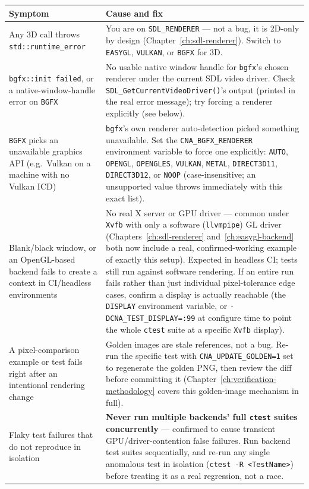 \begin{center}
\begin{longtable}{>{\raggedright\arraybackslash}p{}>{\raggedright\arraybackslash}p{}}
\toprule
\textbf{Symptom} & \textbf{Cause and fix} \\
\midrule
\endhead
Any 3D call throws \texttt{std::runtime\_error} & You are on \texttt{SDL\_RENDERER} --- not a
  bug, it is 2D-only by design (Chapter~\ref{ch:sdl-renderer}). Switch to \texttt{EASYGL},
  \texttt{VULKAN}, or \texttt{BGFX} for 3D. \\[4pt]
\texttt{bgfx::init failed}, or a native-window-handle error on \texttt{BGFX} & No usable
  native window handle for \texttt{bgfx}'s chosen renderer under the current SDL video
  driver. Check \texttt{SDL\_GetCurrentVideoDriver()}'s output (printed in the real error
  message); try forcing a renderer explicitly (see below). \\[4pt]
\texttt{BGFX} picks an unavailable graphics API (e.g.\ Vulkan on a machine with no Vulkan
  ICD) & \texttt{bgfx}'s own renderer auto-detection picked something unavailable. Set the
  \texttt{CNA\_BGFX\_RENDERER} environment variable to force one explicitly: \texttt{AUTO},
  \texttt{OPENGL}, \texttt{OPENGLES}, \texttt{VULKAN}, \texttt{METAL}, \texttt{DIRECT3D11},
  \texttt{DIRECT3D12}, or \texttt{NOOP} (case-insensitive; an unsupported value throws
  immediately with this exact list). \\[4pt]
Blank/black window, or an OpenGL-based backend fails to create a context in CI/headless
  environments & No real X server or GPU driver --- common under \texttt{Xvfb} with only a
  software (\texttt{llvmpipe}) GL driver (Chapters~\ref{ch:sdl-renderer}
  and~\ref{ch:easygl-backend} both now include a real, confirmed-working example of exactly
  this setup). Expected in headless CI; tests still run against software rendering. If an
  entire run fails rather than just individual pixel-tolerance edge cases, confirm a display
  is actually reachable (the \texttt{DISPLAY} environment variable, or
  \texttt{-DCNA\_TEST\_DISPLAY=:99} at configure time to point the whole \texttt{ctest} suite
  at a specific \texttt{Xvfb} display). \\[4pt]
A pixel-comparison example or test fails right after an intentional rendering change &
  Golden images are stale references, not a bug. Re-run the specific test with
  \texttt{CNA\_UPDATE\_GOLDEN=1} set to regenerate the golden PNG, then review the diff before
  committing it (Chapter~\ref{ch:verification-methodology} covers this golden-image mechanism
  in full). \\[4pt]
Flaky test failures that do not reproduce in isolation & \textbf{Never run multiple
  backends' full \texttt{ctest} suites concurrently} --- confirmed to cause transient
  GPU/driver-contention false failures. Run backend test suites sequentially, and re-run any
  single anomalous test in isolation (\texttt{ctest -R <TestName>}) before treating it as a
  real regression, not a race. \\
\bottomrule
\end{longtable}
\end{center}

